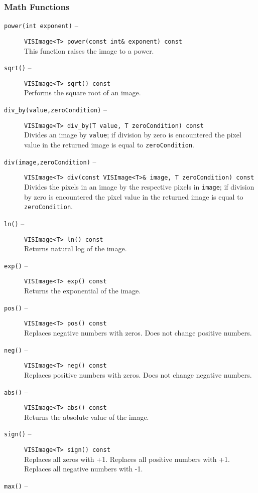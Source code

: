 \subsubsection{Math Functions}
\label{il_mf}
\begin{description}
\item[{\tt power(int exponent)} --]
{\tt VISImage<T> power(const int\& exponent) const}\\
This function raises the image to a power.  
\item[{\tt sqrt()} --]
{\tt VISImage<T> sqrt() const}\\
Performs the square root of an image.
\item[{\tt div\_by(value,zeroCondition)} --]
{\tt VISImage<T> div\_by(T value, T zeroCondition) const}\\
Divides an image by {\tt value}; if division by zero is encountered
the pixel value in the returned image is equal to {\tt zeroCondition}.
\item[{\tt div(image,zeroCondition)} --]
{\tt VISImage<T> div(const VISImage<T>\& image, T zeroCondition) const}\\
Divides the pixels in an image by the respective pixels in {\tt image};
if division by zero is encountered the pixel value in the returned image is
equal to {\tt zeroCondition}.
\item[{\tt ln()} --]
{\tt VISImage<T> ln() const}\\
Returns natural log of the image.
\item[{\tt exp()} --]
{\tt VISImage<T> exp() const}\\
Returns the exponential of the image.
\item[{\tt pos()} --]
{\tt VISImage<T> pos() const}\\
Replaces negative numbers with zeros.  Does not change positive numbers.
\item[{\tt neg()} --]
{\tt VISImage<T> neg() const}\\
Replaces positive numbers with zeros.  Does not change negative numbers.
\item[{\tt abs()} --]
{\tt VISImage<T> abs() const}\\
Returns the absolute value of the image.
\item[{\tt sign()} --]
{\tt VISImage<T> sign() const}\\
Replaces all zeros with +1.  Replaces all positive numbers with +1.
Replaces all negative numbers with -1.
\item[{\tt max()} --]

\end{description}

